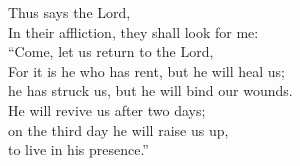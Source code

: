 \lettrine[lines=2]{T}{}hus says the Lord, \\In their affliction, they shall look for me:\\
   “Come, let us return to the Lord,\\
For it is he who has rent, but he will heal us;\\
   he has struck us, but he will bind our wounds.\\
He will revive us after two days;\\
   on the third day he will raise us up,\\
   to live in his presence.”
